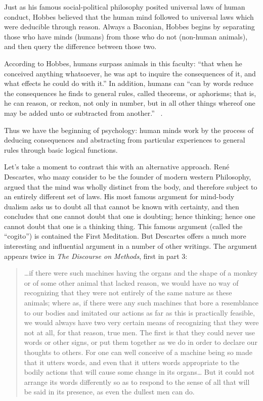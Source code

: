 \begin{refsection}
Just as his famous social-political philosophy posited universal laws of human conduct, Hobbes believed that the human mind followed to universal laws which were deducible through reason. Always a Baconian, Hobbes begins by separating those who have minds (humans) from those who do not (non-human animals), and then query the difference between those two.

According to Hobbes, humans surpass animals in this faculty: ``that when he conceived anything whatsoever, he was apt to inquire the consequences of it, and what effects he could do with it.'' In addition, humans can ``can by words reduce the consequences he finds to general rules, called theorems, or aphorisms; that is, he can reason, or reckon, not only in number, but in all other things whereof one may be added unto or subtracted from another.'' ~\citep[Ch V, \S 6]{Hobbes:1651wh}. 

Thus we have the beginning of psychology: human minds work by the process of deducing consequences and abstracting from particular experiences to general rules through basic logical functions. 

Let's take a moment to contrast this with an alternative approach. René Descartes, who many consider to be the founder of modern western Philosophy, argued that the mind was wholly distinct from the body, and therefore subject to an entirely different set of laws. His most famous argument for mind-body dualism asks us to doubt all that cannot be known with certainty, and then concludes that one cannot doubt that one is doubting; hence thinking; hence one cannot doubt that one is a thinking thing. This famous argument (called the ``cogito'') is contained the First Meditation. But Descartes offers a much more interesting and influential argument in a number of other writings. The argument appears twice in \emph{The Discourse on Methods}, first in part 3:

\begin{quote}

{\ldots}if there were such machines having the organs and the shape of a monkey or of some other animal that lacked reason, we would have no way of recognizing that they were not entirely of the same nature as these animals; where as, if there were any such machines that bore a resemblance to our bodies and imitated our actions as far as this is practically feasible, we would always have two very certain means of recognizing that they were not at all, for that reason, true men. The first is that they could never use words or other signs, or put them together as we do in order to declare our thoughts to others. For one can well conceive of a machine being so made that it utters words, and even that it utters words appropriate to the bodily actions that will cause some change in its organs{\ldots} But it could not arrange its words differently so as to respond to the sense of all that will be said in its presence, as even the dullest men can do. ~\citep[Ch 3, 1637]{Descartes:1968uf}
\end{quote}


\end{refsection}
